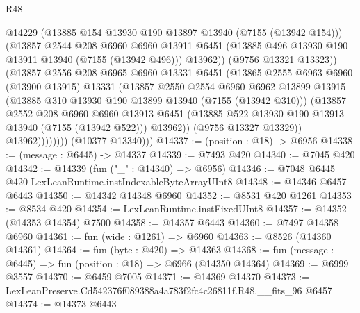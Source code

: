 \begin{lexlean}{R48}
\begin{coremodule}
                          @14229
                          (@13885 @154 @13930 @190 @13897 @13940 (@7155 (@13942 @154)))
                          (@13857
                            @2544
                            @208
                            @6960
                            @6960
                            @13911
                            @6451
                            (@13885 @496 @13930 @190 @13911 @13940 (@7155 (@13942 @496)))
                            @13962))
                        (@9756 @13321 @13323))
                      (@13857
                        @2556
                        @208
                        @6965
                        @6960
                        @13331
                        @6451
                        (@13865
                          @2555
                          @6963
                          @6960
                          (@13900 @13915)
                          @13331
                          (@13857
                            @2550
                            @2554
                            @6960
                            @6962
                            @13899
                            @13915
                            (@13885 @310 @13930 @190 @13899 @13940 (@7155 (@13942 @310)))
                            (@13857
                              @2552
                              @208
                              @6960
                              @6960
                              @13913
                              @6451
                              (@13885 @522 @13930 @190 @13913 @13940 (@7155 (@13942 @522)))
                              @13962))
                          (@9756 @13327 @13329))
                        @13962))))))))
        (@10377 @13340)))
@14337 := (position : @18) -> @6956
@14338 := (message : @6445) -> @14337
@14339 := @7493 @420
@14340 := @7045 @420
@14342 := @14339 (fun ("_" : @14340) => @6956)
@14346 := @7048 @6445 @420 LexLeanRuntime.instIndexableByteArrayUInt8
@14348 := @14346 @6457 @6443
@14350 := @14342 @14348 @6960
@14352 := @8531 @420 @1261
@14353 := @8534 @420
@14354 := LexLeanRuntime.instFixedUInt8
@14357 := @14352 (@14353 @14354) @7500
@14358 := @14357 @6443
@14360 := @7497 @14358 @6960
@14361 := fun (wide : @1261) => @6960
@14363 := @8526 (@14360 @14361)
@14364 := fun (byte : @420) => @14363
@14368 := fun (message : @6445) => fun (position : @18) => @6966 (@14350 @14364)
@14369 := @6999 @3557
@14370 := @6459 @7005
@14371 := @14369 @14370
@14373 := LexLeanPreserve.Cd542376f089388a4a783f2fc4c26811f.R48.__fits_96 @6457
@14374 := @14373 @6443

\end{coremodule}
\end{lexlean}
